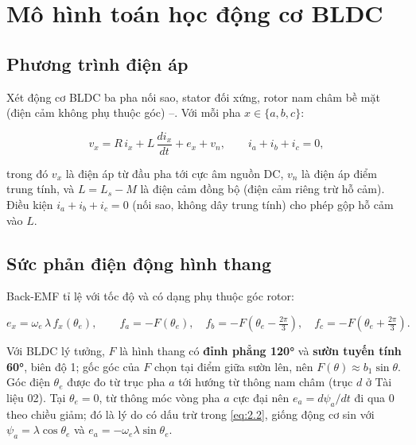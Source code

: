 
\section{Mô hình toán học động cơ BLDC}\label{sec:2}

\subsection{Phương trình điện áp}\label{sec:2.1}

Xét động cơ BLDC ba pha nối sao, stator đối xứng, rotor nam châm bề mặt (điện cảm không phụ thuộc góc) \cite{r1}–\cite{r3}. Với mỗi pha $x\in\{a,b,c\}$:

\begin{equation}
v_x = R\,i_x + L\,\frac{di_x}{dt} + e_x + v_n, \qquad i_a+i_b+i_c = 0,
\tag{2.1}\label{eq:2.1}
\end{equation}

trong đó $v_x$ là điện áp từ đầu pha tới cực âm nguồn DC, $v_n$ là điện áp điểm trung tính, và $L = L_s - M$ là điện cảm đồng bộ (điện cảm riêng trừ hỗ cảm). Điều kiện $i_a+i_b+i_c=0$ (nối sao, không dây trung tính) cho phép gộp hỗ cảm vào $L$.

\subsection{Sức phản điện động hình thang}\label{sec:2.2}

Back-EMF tỉ lệ với tốc độ và có dạng phụ thuộc góc rotor:

\begin{equation}
e_x = \omega_e\,\lambda\, f_x(\theta_e), \qquad
f_a = -F(\theta_e),\quad f_b = -F\!\left(\theta_e - \tfrac{2\pi}{3}\right),\quad f_c = -F\!\left(\theta_e + \tfrac{2\pi}{3}\right).
\tag{2.2}\label{eq:2.2}
\end{equation}

Với BLDC lý tưởng, $F$ là hình thang có \textbf{đỉnh phẳng 120°} và \textbf{sườn tuyến tính 60°}, biên độ 1; gốc góc của $F$ chọn tại điểm giữa sườn lên, nên $F(\theta) \approx b_1\sin\theta$. Góc điện $\theta_e$ được đo từ trục pha $a$ tới hướng từ thông nam châm (trục $d$ ở Tài liệu 02). Tại $\theta_e = 0$, từ thông móc vòng pha $a$ cực đại nên $e_a = d\psi_a/dt$ đi qua 0 theo chiều giảm; đó là lý do có dấu trừ trong \eqref{eq:2.2}, giống động cơ sin với $\psi_a = \lambda\cos\theta_e$ và $e_a = -\omega_e\lambda\sin\theta_e$.

